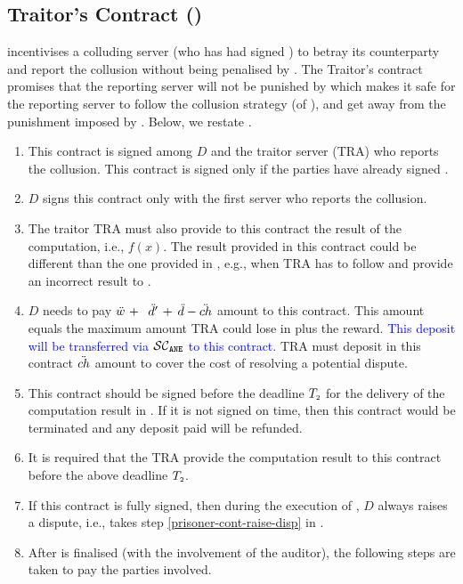 

\subsection{Traitor's Contract (\SCtc)}

\SCtc incentivises a colluding server (who has had signed \SCcc) to betray its counterparty and report the collusion without being penalised by \SCpc.  The Traitor’s contract promises that the reporting server will not be
punished by \SCpc which makes it safe for the reporting server to follow the collusion strategy (of \SCcc), and get away from the punishment imposed by \SCpc. Below, we restate \SCtc. 


\begin{enumerate}
%
\item This contract is signed among $ { D}$ and the traitor server (TRA) who reports the collusion. This contract is signed only if the parties have already signed \SCpc. 
%
\item  $ { D}$ signs this contract only with the first server who reports the collusion. 
%
\item The traitor TRA must also provide to this contract the result of the computation, i.e., $f(x)$. The result provided in this contract could be different than the one provided in \SCpc, e.g., when TRA has to follow \SCcc and provide an incorrect result to \SCpc. 
%
\item  $  D$ needs to pay  $\ddot{w} \ +\ $\textcolor{blue}{ $\ddot{d}' \ + $} $\ddot{d}-\ddot{ch}$ amount to this contract. This amount equals the maximum amount TRA could lose in \SCpc plus the reward. \textcolor{blue}{This deposit will be transferred via $\mathcal{SC}_{\mathtt{ANE}}$ to this contract.}  TRA must deposit in this contract $\ddot{ch}$ amount to cover the cost of resolving a potential dispute.  
%
\item  This contract should be signed before the deadline  $T_{\scriptscriptstyle 2}$  for the delivery of the computation result in \SCpc. If it is not signed on time, then this contract would be terminated and any deposit paid will be refunded.
%
\item It is required that the TRA provide the computation result to this contract before the above deadline $T_{\scriptscriptstyle 2}$.
%
\item If this contract is fully signed, then during the execution of \SCpc, $ { D}$ always raises a dispute, i.e., takes step \ref{prisoner-cont-raise-disp} in \SCpc.
%
\item After \SCpc is finalised (with the involvement of the auditor), the following steps are taken to pay the parties involved.   

\end{enumerate}
